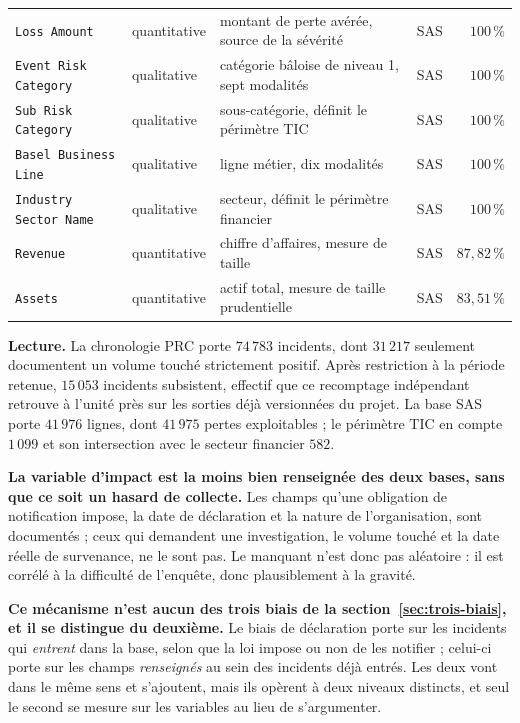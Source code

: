 \begin{center}
\begin{tabular}{@{}l l p{4.6cm} l r@{}}
\texttt{Loss Amount}          & quantitative & montant de perte avérée, source de la sévérité
                                             & SAS & $100\,\%$ \\
\texttt{Event Risk Category}  & qualitative  & catégorie bâloise de niveau 1, sept modalités
                                             & SAS & $100\,\%$ \\
\texttt{Sub Risk Category}    & qualitative  & sous-catégorie, définit le périmètre TIC
                                             & SAS & $100\,\%$ \\
\texttt{Basel Business Line}  & qualitative  & ligne métier, dix modalités
                                             & SAS & $100\,\%$ \\
\texttt{Industry Sector Name} & qualitative  & secteur, définit le périmètre financier
                                             & SAS & $100\,\%$ \\
\texttt{Revenue}              & quantitative & chiffre d'affaires, mesure de taille
                                             & SAS & $87{,}82\,\%$ \\
\texttt{Assets}               & quantitative & actif total, mesure de taille prudentielle
                                             & SAS & $83{,}51\,\%$ \\
\bottomrule
\end{tabular}
\end{center}

\vspace{2pt}
\noindent\textbf{Lecture.} La chronologie PRC porte $74\,783$ incidents, dont $31\,217$ seulement
documentent un volume touché strictement positif. Après restriction à la période retenue,
$15\,053$ incidents subsistent, effectif que ce recomptage indépendant retrouve à l'unité près
sur les sorties déjà versionnées du projet. La base SAS porte $41\,976$ lignes, dont $41\,975$
pertes exploitables ; le périmètre TIC en compte $1\,099$ et son intersection avec le secteur
financier $582$.


\begin{attention}
\textbf{La variable d'impact est la moins bien renseignée des deux bases, sans que ce soit un
hasard de collecte.} Les champs qu'une obligation de notification impose, la date de déclaration
et la nature de l'organisation, sont documentés ; ceux qui demandent une investigation, le volume
touché et la date réelle de survenance, ne le sont pas. Le manquant n'est donc pas aléatoire : il
est corrélé à la difficulté de l'enquête, donc plausiblement à la gravité.

\textbf{Ce mécanisme n'est aucun des trois biais de la section~\ref{sec:trois-biais}, et il se
distingue du deuxième.} Le biais de déclaration porte sur les incidents qui \emph{entrent} dans la
base, selon que la loi impose ou non de les notifier ; celui-ci porte sur les champs
\emph{renseignés} au sein des incidents déjà entrés. Les deux vont dans le même sens et
s'ajoutent, mais ils opèrent à deux niveaux distincts, et seul le second se mesure sur les
variables au lieu de s'argumenter.
\end{attention}

